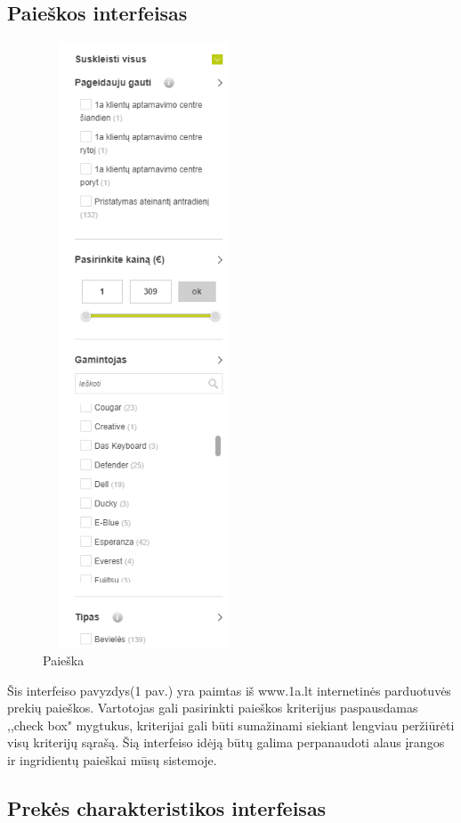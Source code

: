 \documentclass[oneside]{VUMIFPSkursinis}
\begin{document}
	\subsection{Paieškos interfeisas}
		\begin{figure}[h]
			\centering
			\includegraphics[width=6cm,height=18cm,keepaspectratio]{IkvepiantisInterfeisas1.png}
			\caption{ Paieška}
		\end{figure}

			Šis interfeiso pavyzdys(1 pav.) yra paimtas iš www.1a.lt internetinės parduotuvės prekių paieškos. 
			Vartotojas gali pasirinkti paieškos kriterijus paspausdamas ,,check box" mygtukus, kriterijai gali būti sumažinami siekiant lengviau peržiūrėti visų kriterijų sąrašą. 
			Šią interfeiso idėją būtų galima perpanaudoti alaus įrangos ir ingridientų paieškai mūsų sistemoje.
	\pagebreak
	\subsection{Prekės charakteristikos interfeisas}
		
\end{document}
